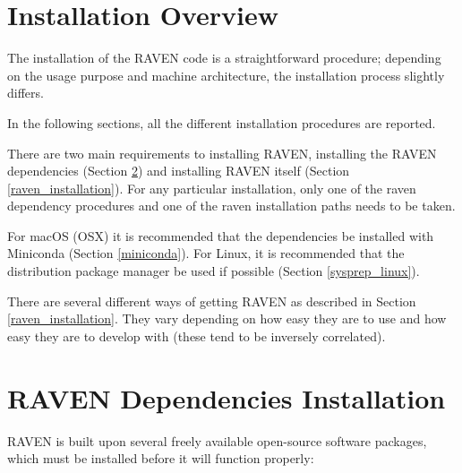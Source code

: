 \section{Installation Overview}

The installation of the RAVEN code is a straightforward procedure;
depending on the usage purpose and machine architecture, the
installation process slightly differs.

In the following sections, all the different installation procedures
are reported.

There are two main requirements to installing RAVEN, installing the
RAVEN dependencies (Section \ref{raven_dependencies}) and installing
RAVEN itself (Section \ref{raven_installation}).  For any particular
installation, only one of the raven dependency procedures and one of
the raven installation paths needs to be taken.

For macOS (OSX) it is recommended that the dependencies be installed with
Miniconda (Section \ref{miniconda}).  For Linux, it is recommended
that the distribution package manager be used if possible (Section
\ref{sysprep_linux}).

There are several different ways of getting RAVEN as described in
Section \ref{raven_installation}.  They vary depending on how easy
they are to use and how easy they are to develop with (these tend to
be inversely correlated).

\newcommand{\goToRavenInstallation}{Now go on to Section \ref{raven_installation} for Raven installation.
}


\section{RAVEN Dependencies Installation}
\label{raven_dependencies}

RAVEN is built upon several freely available open-source software packages,
which must  be installed before it will function properly:

